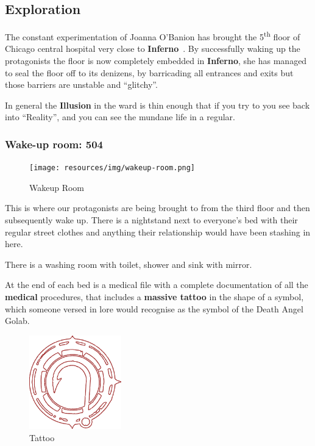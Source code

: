 \documentclass[bg-full]{resources/stylesheets/kult}
\begin{document}
\subsection{Exploration}%
\label{sub:exploration}

The constant experimentation of Joanna O'Banion has brought the 5\textsuperscript{th} floor of Chicago
central hospital very close to \textbf{Inferno}~\cite[p.~314]{KULT:core}.  By successfully waking up the protagonists the floor
is now completely embedded in \textbf{Inferno}, she has managed to seal the floor off to its denizens, by barricading all
entrances and exits but those barriers are unstable and “glitchy”.

In general the \textbf{Illusion} in the ward is thin enough that if you try to  you see back
into “Reality”, and you can see the mundane life in a regular.

\subsubsection{Wake-up room: 504}%
\label{ssub:wake_up_room}

\begin{figure}[!htbp]
  \centering
  \texttt{[image: resources/img/wakeup-room.png]}%
  \caption{Wakeup Room}
\end{figure}

This is where our protagonists are being brought to from the third floor and then subsequently wake up.  There is a nightstand
next to everyone's bed with their regular street clothes and anything their relationship would have been stashing in here.

There is a washing room with toilet, shower and sink with mirror.

At the end of each bed is a medical file with a complete documentation of all the \textbf{medical} procedures, that includes a
\textbf{massive tattoo} in the shape of a symbol, which someone versed in lore would recognise as the symbol of the Death Angel
Golab.

\begin{figure}[!htbp]
  \centering
  \includegraphics[width=4.0cm]{resources/img/golab.png}
  \caption{Tattoo~\cite[p.~215]{KULT:core}}
\end{figure}
\end{document}
